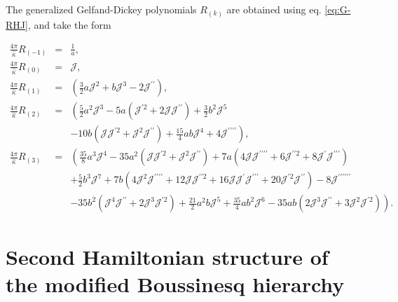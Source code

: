 \documentclass[letterpaper,11pt,oneside]{book}
\begin{document}
The generalized Gelfand-Dickey polynomials $R_{\left(k\right)}$ are
obtained using eq. \eqref{eq:G-RHJ}, and take the form

\begin{eqnarray}
	\frac{4\pi}{\hat{\kappa}}R_{\left(-1\right)} & = & \frac{1}{a},\nonumber \\
	\frac{4\pi}{\hat{\kappa}}R_{\left(0\right)} & = & \mathcal{J},\nonumber \\
	\frac{4\pi}{\hat{\kappa}}R_{\left(1\right)} & = & \left(\frac{3}{2}a\mathcal{J}^{2}+b\mathcal{J}^{3}-2\mathcal{J^{\prime\prime}}\right),\nonumber \\
	\frac{4\pi}{\hat{\kappa}}R_{\left(2\right)} & = & \left(\frac{5}{2}a^{2}\mathcal{J}^{3}-5a\left(\mathcal{J}^{\prime2}+2\mathcal{J}\mathcal{J}^{\prime\prime}\right)+\frac{3}{2}b^{2}\mathcal{J}^{5}\right.\label{eq:k-thR}\\
	&  & \left.-10b\left(\mathcal{J}\mathcal{J}^{\prime2}+\mathcal{J}^{2}\mathcal{\mathcal{J}^{\prime\prime}}\right)+\frac{15}{4}ab\mathcal{J}^{4}+4\mathcal{J}^{\prime\prime\prime\prime}\right),\nonumber \\
	\frac{4\pi}{\hat{\kappa}}R_{\left(3\right)} & = & \left(\frac{35}{8}a^{3}\mathcal{J}^{4}-35a^{2}\left(\mathcal{J}\mathcal{\mathcal{J}}^{\prime2}+\mathcal{J}^{2}\mathcal{\mathcal{J}^{\prime\prime}}\right)+7a\left(4\mathcal{J}\mathcal{J}^{\prime\prime\prime\prime}+6\mathcal{J}^{\prime\prime2}+8\mathcal{J}^{\prime}\mathcal{J}^{\prime\prime\prime}\right)\right.\nonumber \\
	&  & +\frac{5}{2}b^{3}\mathcal{J}^{7}+7b\left(4\mathcal{J}^{2}\mathcal{J}^{\prime\prime\prime\prime}+12\mathcal{J}\mathcal{J}^{\prime\prime2}+16\mathcal{J}\mathcal{J}^{\prime}\mathcal{J}^{\prime\prime\prime}+20\mathcal{J}^{\prime2}\mathcal{J}^{\prime\prime}\right)-8\mathcal{J}^{\prime\prime\prime\prime\prime\prime}\nonumber \\
	&  & \left.-35b^{2}\left(\mathcal{J}^{4}\mathcal{J}^{\prime\prime}+2\mathcal{J}^{3}\mathcal{J}^{\prime2}\right)+\frac{21}{2}a^{2}b\mathcal{J}^{5}+\frac{35}{4}ab^{2}\mathcal{J}^{6}-35ab\left(2\mathcal{J}^{3}\mathcal{J}^{\prime\prime}+3\mathcal{J}^{2}\mathcal{J}^{\prime2}\right)\right).\nonumber 
\end{eqnarray}


\chapter{Second Hamiltonian structure of the modified Boussinesq hierarchy\label{Appendix 3: Second Hamiltonian structure mBsq}}
\end{document}
